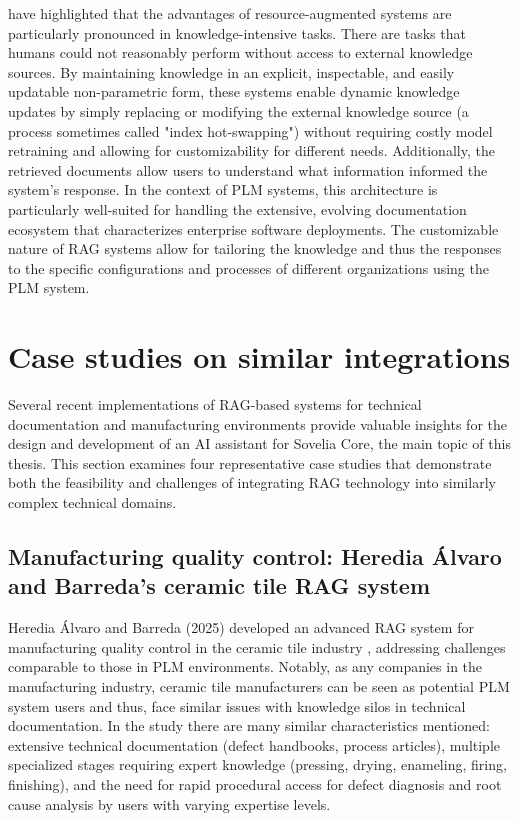 \textcite{lewis_retrieval-augmented_2021} have highlighted that the advantages of resource-augmented systems are particularly pronounced in knowledge-intensive tasks. There are tasks that humans could not reasonably perform without access to external knowledge sources. By maintaining knowledge in an explicit, inspectable, and easily updatable non-parametric form, these systems enable dynamic knowledge updates by simply replacing or modifying the external knowledge source (a process sometimes called "index hot-swapping") without requiring costly model retraining and allowing for customizability for different needs. Additionally, the retrieved documents allow users to understand what information informed the system's response. In the context of PLM systems, this architecture is particularly well-suited for handling the extensive, evolving documentation ecosystem that characterizes enterprise software deployments. The customizable nature of RAG systems allow for tailoring the knowledge and thus the responses to the specific configurations and processes of different organizations using the PLM system.

\section{Case studies on similar integrations}
\label{sec:case-studies-on-similar-integrations}

Several recent implementations of RAG-based systems for technical documentation and manufacturing environments provide valuable insights for the design and development of an AI assistant for Sovelia Core, the main topic of this thesis. This section examines four representative case studies that demonstrate both the feasibility and challenges of integrating RAG technology into similarly complex technical domains.

\subsection*{Manufacturing quality control: Heredia Álvaro and Barreda's ceramic tile RAG system}

Heredia Álvaro and Barreda (2025) developed an advanced RAG system for manufacturing quality control in the ceramic tile industry \parencite{heredia_alvaro_advanced_2025}, addressing challenges comparable to those in PLM environments. Notably, as any companies in the manufacturing industry, ceramic tile manufacturers can be seen as potential PLM system users and thus, face similar issues with knowledge silos in technical documentation. In the study there are many similar characteristics mentioned: extensive technical documentation (defect handbooks, process articles), multiple specialized stages requiring expert knowledge (pressing, drying, enameling, firing, finishing), and the need for rapid procedural access for defect diagnosis and root cause analysis by users with varying expertise levels.

